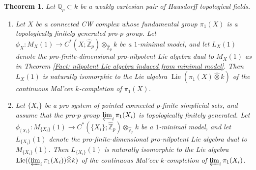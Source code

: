 \documentclass[11pt]{amsart}
\newtheorem{theorem}{Theorem}[section]
\theoremstyle{definition}
\numberwithin{equation}{section}
\numberwithin{equation}{section}
\newcommand\QQ{\mathbb{Q}}
\newcommand\ZZ{\mathbb{Z}}
\DeclareMathOperator{\Lie}{Lie}
\begin{document}
\begin{theorem}\label{Thm: 1-minimal model is Malcev completion}
Let $\QQ_p\subset k$ be a weakly cartesian pair of Hausdorff topological fields.
\begin{enumerate}[leftmargin=0.25in]
    \item Let $X$ be a connected CW complex whose fundamental group $\pi_1(X)$ is a topologically finitely generated pro-$p$ group. Let $\phi_X:M_X(1)\rightarrow C^*(X;\widehat{\ZZ}_p)\otimes_{\widehat{\ZZ}_p}k$ be a $1$-minimal model, and let $L_X(1)$ denote the pro-finite-dimensional pro-nilpotent Lie algebra dual to $M_X(1)$ as in Theorem \ref{Fact: nilpotent Lie algebra induced from minimal model}. Then $L_X(1)$ is naturally isomorphic to the Lie algebra $\Lie(\pi_1(X)\widehat{\otimes} k)$ of the continuous Mal'cev $k$-completion of $\pi_1(X)$.
    \item Let $\{X_i\}$ be a pro system of pointed connected $p$-finite simplicial sets, and assume that the pro-$p$ group $\varprojlim_i \pi_1(X_i)$ is topologically finitely generated. Let $\phi_{\{X_i\}}:M_{\{X_i\}}(1)\rightarrow C^*(\{X_i\};\widehat{\ZZ}_p)\otimes_{\widehat{\ZZ}_p}k$ be a $1$-minimal model, and let $L_{\{X_i\}}(1)$ denote the pro-finite-dimensional pro-nilpotent Lie algebra dual to $M_{\{X_i\}}(1)$. Then $L_{\{X_i\}}(1)$ is naturally isomorphic to the Lie algebra $\Lie((\varprojlim_i \pi_1(X_i))\widehat{\otimes} k)$ of the continuous Mal'cev $k$-completion of $\varprojlim_i \pi_1(X_i)$.
\end{enumerate}
\end{theorem}
\end{document}
